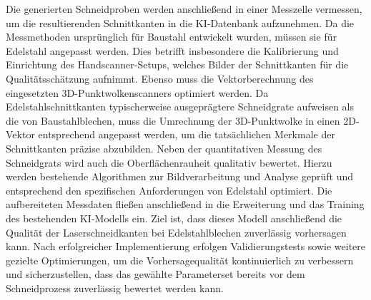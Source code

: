 Die generierten Schneidproben werden anschließend in einer Messzelle vermessen, um die resultierenden Schnittkanten in die KI-Datenbank aufzunehmen. Da die Messmethoden ursprünglich für Baustahl entwickelt wurden, müssen sie für Edelstahl angepasst werden. Dies betrifft insbesondere die Kalibrierung und Einrichtung des Handscanner-Setups, welches Bilder der Schnittkanten für die Qualitätsschätzung aufnimmt. Ebenso muss die Vektorberechnung des eingesetzten 3D-Punktwolkenscanners optimiert werden. Da Edelstahlschnittkanten typischerweise ausgeprägtere Schneidgrate aufweisen als die von Baustahlblechen, muss die Umrechnung der 3D-Punktwolke in einen 2D-Vektor entsprechend angepasst werden, um die tatsächlichen Merkmale der Schnittkanten präzise abzubilden.
Neben der quantitativen Messung des Schneidgrats wird auch die Oberflächenrauheit qualitativ bewertet. Hierzu werden bestehende Algorithmen zur Bildverarbeitung und Analyse geprüft und entsprechend den spezifischen Anforderungen von Edelstahl optimiert.
Die aufbereiteten Messdaten fließen anschließend in die Erweiterung und das Training des bestehenden KI-Modells ein. Ziel ist, dass dieses Modell anschließend die Qualität der Laserschneidkanten bei Edelstahlblechen zuverlässig vorhersagen kann. Nach erfolgreicher Implementierung erfolgen Validierungstests sowie weitere gezielte Optimierungen, um die Vorhersagequalität kontinuierlich zu verbessern und sicherzustellen, dass das gewählte Parameterset bereits vor dem Schneidprozess zuverlässig bewertet werden kann.